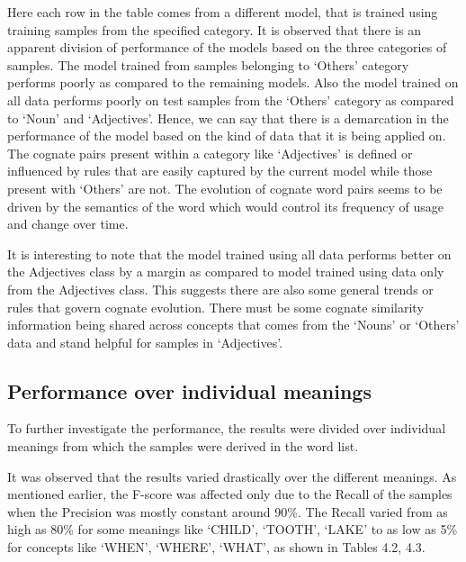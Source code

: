 Here each row in the table comes from a different model, that is trained using training samples from the specified category. It is observed that there is an apparent division of performance of the models based on the three categories of samples. The model trained from samples belonging to `Others' category performs poorly as compared to the remaining models. Also the model trained on all data performs poorly on test samples from the `Others' category as compared to `Noun' and `Adjectives'.  Hence,  we can say that there is a demarcation in the performance of the model based on the kind of data that it is being applied on. The cognate pairs present within a category like `Adjectives' is defined or influenced by  rules that are easily captured by the current model while those present with `Others' are not. The evolution of cognate word pairs seems to be driven by the semantics of the word which would control its frequency of usage and change over time.

It is interesting to note that the model trained using all data performs better on the Adjectives class by a margin as compared to model trained using data only from the Adjectives class. This suggests there are also some general trends or rules that govern cognate evolution. There must be some cognate similarity information being shared across concepts that comes from the `Nouns' or `Others' data and stand helpful for samples in `Adjectives'.

\subsection{Performance over individual meanings}

To further investigate the performance, the results were divided over individual meanings from which the samples were derived in the word list. 

It was observed that the results varied drastically over the different meanings. As mentioned earlier, the F-score was affected only due to the Recall of the samples when the Precision was mostly constant around 90\%. The Recall varied from as high as 80\% for some meanings like `CHILD', `TOOTH', `LAKE' to as low as 5\% for concepts like `WHEN', `WHERE', `WHAT', as shown in Tables 4.2, 4.3.

